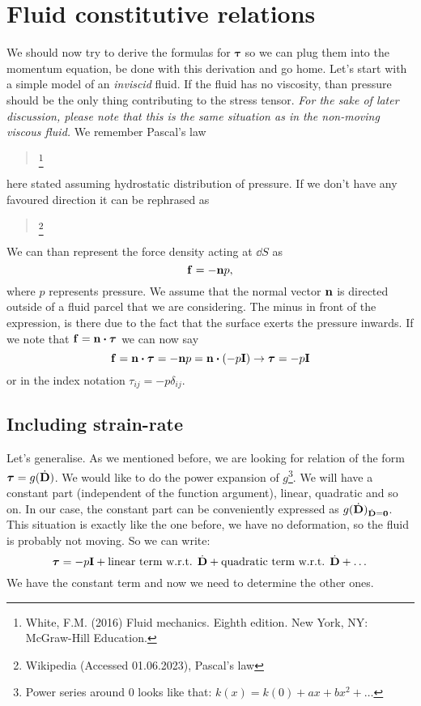 \documentclass[justified, nobib]{tufte-handout}
\begin{document}
\section{Fluid constitutive relations}

We should now try to derive the formulas for \(\bm{\tau}\) so we can plug
them into the momentum equation, be done with this derivation and go home.
Let's start with a simple model of an \emph{inviscid} fluid. If the fluid
has no viscosity, than pressure should be the only thing contributing to
the stress tensor. \emph{For the sake of later discussion, please note that
	this is the same situation as in the non-moving viscous fluid.} We remember
Pascal's law
\begin{quote}
	\footnote{%
		White, F.M. (2016) Fluid mechanics. Eighth edition. New York,
		NY: McGraw-Hill Education.}
\end{quote}
here stated assuming hydrostatic distribution of pressure. If we don't have
any favoured direction it can be rephrased as
\begin{quote}
	\footnote{%
		Wikipedia (Accessed 01.06.2023), Pascal's law}
\end{quote}
We can than represent the force density acting at \(\dd{S}\) as
\[
	\vb{f} = -\vb{n}p,
\]
where \(p\) represents pressure. We assume that the normal vector \(\vb{n}\) is
directed outside of a fluid parcel that we are considering. The minus in front
of the expression, is there due to the fact that the surface exerts the pressure
inwards. If we note that \(\vb{f} = \vb{n}\dotproduct\bm{\tau}\) we can now say
\[
	\vb{f} = \vb{n}\dotproduct\bm{\tau} = -\vb{n}p = \vb{n}\dotproduct \qty( -p\vb{I} )
	\rightarrow \bm{\tau} = -p \vb{I}
\]
or in the index notation \(\tau_{ij} = -p \delta_{ij}\).


\subsection{Including strain-rate}
Let's generalise. As we mentioned before, we are looking for
relation of the form \(\bm{\tau} = g(\dot{\vb{D}})\). We would like to do the
power expansion of \(g\)\footnote{Power series around 0 looks like that:
	\(k(x) = k(0) + ax + bx^2 + \dots\)}. We will have a constant part (independent
of the function argument), linear, quadratic and so on. In our case, the
constant part can be conveniently expressed as
\(g(\dot{\vb{D}})_{\dot{\vb{D}} = \vb{0}}\). This situation is exactly like the
one before, we have no deformation, so the fluid is probably not moving. So
we can write:
\[
	\bm{\tau} = -p\vb{I} + \text{linear term w.r.t. } \dot{\vb{D}}
	+ \text{quadratic term w.r.t. } \dot{\vb{D}} + \dots
\]
We have the constant term and now we need to determine the other ones.
\end{document}
